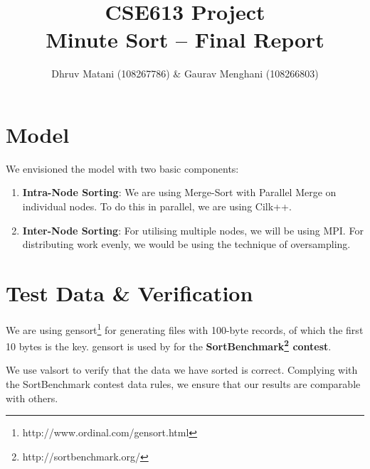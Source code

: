 \documentclass{article}
\title{CSE613 Project\\Minute Sort -- Final Report}
\author{Dhruv Matani (108267786) \& Gaurav Menghani (108266803)}
\begin{document}
\maketitle

\clearpage

\section{Model}
We envisioned the model with two basic components:
\begin{enumerate}
\item {\bf{Intra-Node Sorting}}: We are using Merge-Sort with Parallel Merge on individual nodes. To do this in parallel, 
we are using Cilk++. 

\item {\bf{Inter-Node Sorting}}: For utilising multiple nodes, we will be using MPI. For distributing work evenly, 
we would be using the technique of oversampling.
\end{enumerate}

\section{Test Data \& Verification}
We are using gensort\footnote{http://www.ordinal.com/gensort.html} for generating files with 100-byte records, 
of which the first 10 bytes is the key. gensort is used by for the {\bf SortBenchmark\footnote{http://sortbenchmark.org/} contest}.

We use valsort to verify that the data we have sorted is correct. Complying with the SortBenchmark contest data
rules, we ensure that our results are comparable with others.
\end{document}
